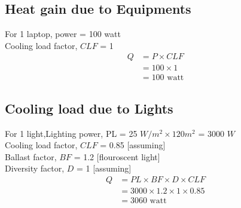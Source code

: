 \documentclass{article}
\begin{document}
    \subsection{Heat gain due to Equipments}
    For 1 laptop, power = 100 watt \\
    Cooling load factor, $CLF$ = 1 \\

    \begin{align*}
      Q &= P \times CLF \\
      &= 100 \times 1 \\
      &= 100 \text{ watt}
    \end{align*}

    \subsection{Cooling load due to Lights}
    For 1 light,Lighting power, PL = 25 $W/m^2 \times 120 m^2$ = 3000 $W$ \\
    Cooling load factor, $CLF$ = 0.85 [assuming] \\
    Ballast factor, $BF$ = 1.2 [flouroscent light] \\
    Diversity factor, $D$ = 1  [assuming]\\

    \begin{align*}
      Q &= PL \times BF \times D \times CLF \\
      &= 3000 \times 1.2 \times 1 \times 0.85 \\
      &= 3060 \text{ watt}
    \end{align*}
    \vspace*{1cm}
\end{document}
